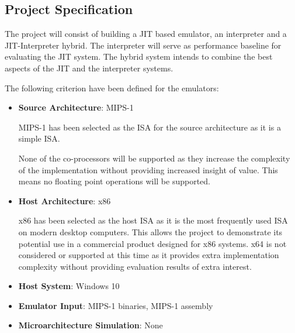 \subsection{Project Specification}

The project will consist of building a JIT based emulator, an interpreter and a JIT-Interpreter hybrid. The interpreter will serve as performance baseline for evaluating the JIT system. The hybrid system intends to combine the best aspects of the JIT and the interpreter systems.

The following criterion have been defined for the emulators:

\begin{itemize}
    \item \textbf{Source Architecture}: MIPS-1
    
    MIPS-1 has been selected as the ISA for the source architecture as it is a simple ISA. 

    None of the co-processors will be supported as they increase the complexity of the implementation without providing increased insight of value. This means no floating point operations will be supported.
    
    \item \textbf{Host Architecture}: x86
    
    x86 has been selected as the host ISA as it is the most frequently used ISA on modern desktop computers. This allows the project to demonstrate its potential use in a commercial product designed for x86 systems. x64 is not considered or supported at this time as it provides extra implementation complexity without providing evaluation results of extra interest.
    
    \item \textbf{Host System}: Windows 10
    \item \textbf{Emulator Input}: MIPS-1 binaries, MIPS-1 assembly
    \item \textbf{Microarchitecture Simulation}: None
\end{itemize}